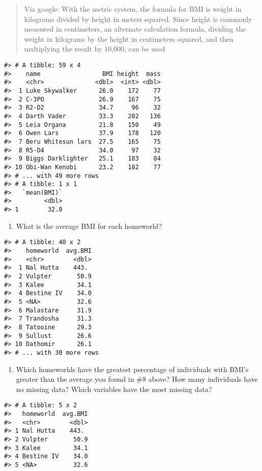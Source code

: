 \documentclass[
]{book}
\providecommand{\tightlist}{%
  \setlength{\itemsep}{0pt}\setlength{\parskip}{0pt}}
\begin{document}
\begin{quote}
Via google: With the metric system, the formula for BMI is weight in kilograms divided by height in meters squared. Since height is commonly measured in centimeters, an alternate calculation formula, dividing the weight in kilograms by the height in centimeters squared, and then multiplying the result by 10,000, can be used
\end{quote}

\begin{verbatim}
#> # A tibble: 59 x 4
#>    name                 BMI height  mass
#>    <chr>              <dbl>  <int> <dbl>
#>  1 Luke Skywalker      26.0    172    77
#>  2 C-3PO               26.9    167    75
#>  3 R2-D2               34.7     96    32
#>  4 Darth Vader         33.3    202   136
#>  5 Leia Organa         21.8    150    49
#>  6 Owen Lars           37.9    178   120
#>  7 Beru Whitesun lars  27.5    165    75
#>  8 R5-D4               34.0     97    32
#>  9 Biggs Darklighter   25.1    183    84
#> 10 Obi-Wan Kenobi      23.2    182    77
#> # ... with 49 more rows
#> # A tibble: 1 x 1
#>   `mean(BMI)`
#>         <dbl>
#> 1        32.0
\end{verbatim}

\begin{enumerate}
\def\labelenumi{\arabic{enumi}.}
\setcounter{enumi}{7}
\tightlist
\item
  What is the average BMI for each homeworld?
\end{enumerate}

\begin{verbatim}
#> # A tibble: 40 x 2
#>    homeworld  avg.BMI
#>    <chr>        <dbl>
#>  1 Nal Hutta    443. 
#>  2 Vulpter       50.9
#>  3 Kalee         34.1
#>  4 Bestine IV    34.0
#>  5 <NA>          32.6
#>  6 Malastare     31.9
#>  7 Trandosha     31.3
#>  8 Tatooine      29.3
#>  9 Sullust       26.6
#> 10 Dathomir      26.1
#> # ... with 30 more rows
\end{verbatim}

\begin{enumerate}
\def\labelenumi{\arabic{enumi}.}
\setcounter{enumi}{8}
\tightlist
\item
  Which homeworlds have the greatest percentage of individuals with BMI's greater than the average you found in \#8 above?
  How many individuals have no missing data? Which variables have the most missing data?
\end{enumerate}

\begin{verbatim}
#> # A tibble: 5 x 2
#>   homeworld  avg.BMI
#>   <chr>        <dbl>
#> 1 Nal Hutta    443. 
#> 2 Vulpter       50.9
#> 3 Kalee         34.1
#> 4 Bestine IV    34.0
#> 5 <NA>          32.6
\end{verbatim}
\end{document}
